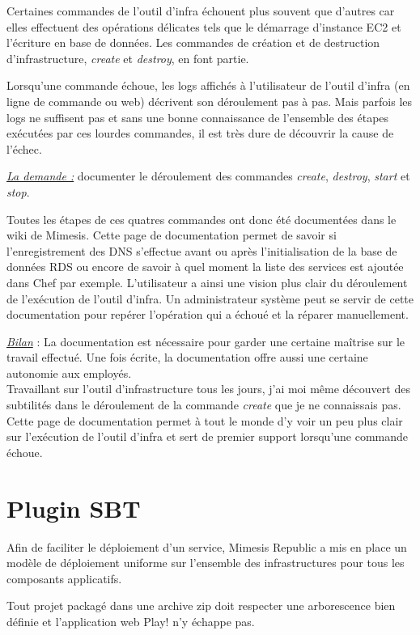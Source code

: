 Certaines commandes de l'outil d'infra échouent plus souvent que
d'autres car elles effectuent des opérations délicates tels que le démarrage
d'instance EC2 et l'écriture en base de données. Les commandes de création et de
destruction d'infrastructure, \textit{create} et \textit{destroy}, en font
partie.

Lorsqu'une commande échoue, les logs affichés à l'utilisateur de l'outil d'infra
(en ligne de commande ou web) décrivent son déroulement pas à pas. Mais parfois
les logs ne suffisent pas et sans une bonne connaissance de l'ensemble des
étapes exécutées par ces lourdes commandes, il est très dure de découvrir la
cause de l'échec.

\underline{\textit{La demande :}} documenter le déroulement des commandes \textit{create},
\textit{destroy}, \textit{start} et \textit{stop}.

Toutes les étapes de ces quatres commandes ont donc été documentées dans le wiki
de Mimesis. Cette page de documentation permet de savoir si l'enregistrement des
DNS s'effectue avant ou après l'initialisation de la base de données RDS ou
encore de savoir à quel moment la liste des services est ajoutée dans Chef par
exemple.
L'utilisateur a ainsi une vision plus clair du déroulement de l'exécution de
l'outil d'infra.
Un administrateur système peut se servir de cette documentation pour repérer
l'opération qui a échoué et la réparer manuellement.

\underline{\textit{Bilan}} : La documentation est nécessaire pour garder une certaine
maîtrise sur le travail effectué. Une fois écrite, la documentation offre aussi
une certaine autonomie aux employés. \\
Travaillant sur l'outil d'infrastructure tous les jours, j'ai moi même découvert
des subtilités dans le déroulement de la commande \textit{create} que je ne
connaissais pas. Cette page de documentation permet à tout le monde d'y voir
un peu plus clair sur l'exécution de l'outil d'infra et sert de premier support
lorsqu'une commande échoue.

\section{Plugin SBT}

Afin de faciliter le déploiement d'un service, Mimesis Republic a mis en place
un modèle de déploiement uniforme sur l'ensemble des infrastructures pour tous
les composants applicatifs.

Tout projet packagé dans une archive zip doit respecter une arborescence bien
définie et l'application web Play! n'y échappe pas.

